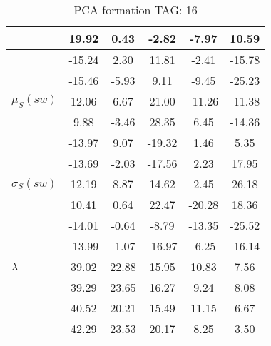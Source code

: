 \begin{table}[h!]
\begin{center}
\begin{tabular}{| l | c | c | c | c | c |}
 & 19.92  & 0.43  & -2.82  & -7.97  & 10.59 \\\hline
 & -15.24  & 2.30  & 11.81  & -2.41  & -15.78 \\\hline
 & -15.46  & -5.93  & 9.11  & -9.45  & -25.23 \\\hline
$\mu_S(sw)$ & 12.06  & 6.67  & 21.00  & -11.26  & -11.38 \\\hline
 & 9.88  & -3.46  & 28.35  & 6.45  & -14.36 \\\hline
 & -13.97  & 9.07  & -19.32  & 1.46  & 5.35 \\\hline
 & -13.69  & -2.03  & -17.56  & 2.23  & 17.95 \\\hline
$\sigma_S(sw)$ & 12.19  & 8.87  & 14.62  & 2.45  & 26.18 \\\hline
 & 10.41  & 0.64  & 22.47  & -20.28  & 18.36 \\\hline
 & -14.01  & -0.64  & -8.79  & -13.35  & -25.52 \\\hline
 & -13.99  & -1.07  & -16.97  & -6.25  & -16.14 \\\hline
$\lambda$ & 39.02  & 22.88  & 15.95  & 10.83  & 7.56 \\\hline
 & 39.29  & 23.65  & 16.27  & 9.24  & 8.08 \\\hline
 & 40.52  & 20.21  & 15.49  & 11.15  & 6.67 \\\hline
 & 42.29  & 23.53  & 20.17  & 8.25  & 3.50 \\\hline
\end{tabular}
\caption{PCA formation TAG: 16}
\end{center}
\end{table}